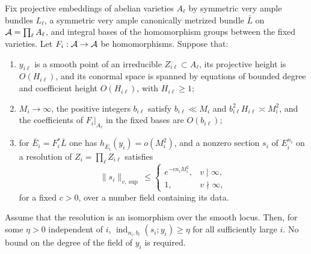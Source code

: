 \begin{proposition}\label{prop:index}
Fix projective embeddings of abelian varieties $A_\ell$ by symmetric
very ample bundles $L_\ell$, a symmetric very ample canonically metrized
bundle $\bar L$ on $\mathcal A=\prod_\ell A_\ell$, and integral bases of the
homomorphism groups between the fixed varieties.  Let
$F_i:\mathcal A\to\mathcal A$ be homomorphisms.  Suppose that:
\begin{enumerate}
\item $y_{i\ell}$ is a smooth point of an irreducible
$Z_{i\ell}\subset A_\ell$, its projective height is $O(H_{i\ell})$,
and its conormal space is spanned by equations of bounded degree and
coefficient height $O(H_{i\ell})$, with $H_{i\ell}\ge1$;
\item $M_i\longrightarrow\infty$, the positive integers $b_{i\ell}$
satisfy $b_{i\ell}\ll M_i$ and
$b_{i\ell}^2H_{i\ell}\asymp M_i^2$, and the coefficients of
$F_i|_{A_\ell}$ in the fixed bases are $O(b_{i\ell})$;
\item for $\bar E_i=F_i^*\bar L$ one has
$h_{\bar E_i}(y_i)=o(M_i^2)$, and a nonzero section $s_i$ of
$E_i^{n_i}$ on a resolution of $Z_i=\prod_\ell Z_{i\ell}$ satisfies
\begin{equation}\label{eq:index-small-section}
 \|s_i\|_{v,\sup}\le
 \begin{cases}
 e^{-c n_iM_i^2},&v\mid\infty,\\
 1,&v\nmid\infty,
 \end{cases}
\end{equation}
for a fixed $c>0$, over a number field containing its data.
\end{enumerate}
Assume that the resolution is an isomorphism over the smooth locus.
Then, for some $\eta>0$ independent of $i$,
$\operatorname{ind}_{n_i,b_i}(s_i;y_i)\ge\eta$ for all sufficiently
large $i$.  No bound on the degree of the field of $y_i$ is required.
\end{proposition}

